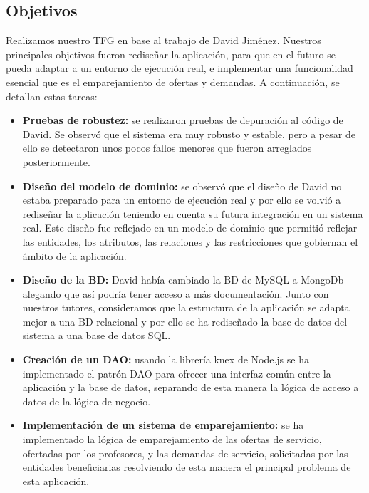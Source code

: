\documentclass{article}
\begin{document}
\subsection{Objetivos}
Realizamos nuestro TFG en base al trabajo de David Jiménez.
Nuestros principales objetivos fueron rediseñar la aplicación, para que en el futuro se pueda adaptar a un entorno de ejecución real, e implementar una funcionalidad esencial que es el emparejamiento de ofertas y demandas.
A continuación, se detallan estas tareas:
\begin{itemize}
\item \textbf{Pruebas de robustez:} se realizaron pruebas de depuración al código de David. Se observó que el sistema era muy robusto y estable, pero a pesar de ello se detectaron unos pocos fallos menores que fueron arreglados posteriormente.
\item \textbf{Diseño del modelo de dominio:} se observó que el diseño de David no estaba preparado para un entorno de ejecución real y por ello se volvió a rediseñar la aplicación teniendo en cuenta su futura integración en un sistema real. Este diseño fue reflejado en un modelo de dominio que permitió reflejar las entidades, los atributos, las relaciones y las restricciones que gobiernan el ámbito de la aplicación.
\item \textbf{Diseño de la BD:} David había cambiado la BD de MySQL a MongoDb alegando que así podría tener acceso a más documentación. Junto con nuestros tutores, consideramos que la estructura de la aplicación se adapta mejor a una BD relacional y por ello se ha rediseñado la base de datos del sistema a una base de datos SQL.
\item \textbf{Creación de un DAO:} usando la librería knex de Node.js se ha implementado el patrón DAO para ofrecer una interfaz común entre la aplicación y la base de datos, separando de esta manera la lógica de acceso a datos de la lógica de negocio.
\item \textbf{Implementación de un sistema de emparejamiento:} se ha implementado la lógica de emparejamiento de las ofertas de servicio, ofertadas por los profesores, y las demandas de servicio, solicitadas por las entidades beneficiarias resolviendo de esta manera el principal problema de esta aplicación.
\end{itemize}




\end{document}
